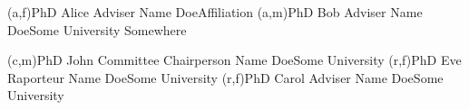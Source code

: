 
\ncmember(a,f){PhD Alice Adviser Name Doe}{Affiliation}
\ncmember(a,m){PhD Bob Adviser Name Doe}{Some University Somewhere}

\ncmember(c,m){PhD John Committee Chairperson Name Doe}{Some University}
\ncmember(r,f){PhD Eve Raporteur Name Doe}{Some University}
\ncmember(r,f){PhD Carol Adviser Name Doe}{Some University}


